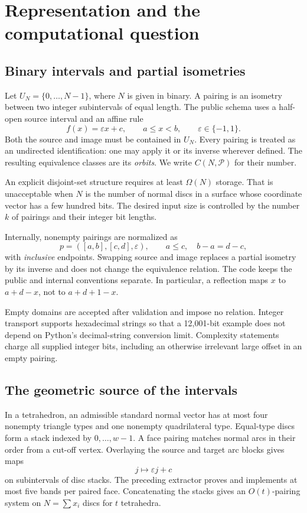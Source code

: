 \documentclass[11pt,a4paper]{article}
\theoremstyle{definition}\newtheorem{definition}[theorem]{Definition}
\theoremstyle{remark}\newtheorem{remark}[theorem]{Remark}
\begin{document}
\section{Representation and the computational question}

\subsection{Binary intervals and partial isometries}

Let $U_N=\{0,\ldots,N-1\}$, where $N$ is given in binary. A pairing is an
isometry between two integer subintervals of equal length. The public schema
uses a half-open source interval and an affine rule
\[
   f(x)=\varepsilon x+c,\qquad a\leq x<b,\qquad \varepsilon\in\{-1,1\}.
\]
Both the source and image must be contained in $U_N$. Every pairing is treated
as an undirected identification: one may apply it or its inverse wherever
defined. The resulting equivalence classes are its \emph{orbits}. We write
$C(N,\mathcal P)$ for their number.

An explicit disjoint-set structure requires at least $\Omega(N)$ storage.
That is unacceptable when $N$ is the number of normal discs in a surface
whose coordinate vector has a few hundred bits. The desired input size is
controlled by the number $k$ of pairings and their integer bit lengths.

Internally, nonempty pairings are normalized as
\[
 p=([a,b],[c,d],\varepsilon),\qquad a\leq c,
 \quad b-a=d-c,
\]
with \emph{inclusive} endpoints. Swapping source and image replaces a partial
isometry by its inverse and does not change the equivalence relation. The
code keeps the public and internal conventions separate. In particular, a
reflection maps $x$ to $a+d-x$, not to $a+d+1-x$.

Empty domains are accepted after validation and impose no relation. Integer
transport supports hexadecimal strings so that a 12,001-bit example does not
depend on Python's decimal-string conversion limit. Complexity statements
charge all supplied integer bits, including an otherwise irrelevant large
offset in an empty pairing.

\subsection{The geometric source of the intervals}

In a tetrahedron, an admissible standard normal vector has at most four
nonempty triangle types and one nonempty quadrilateral type. Equal-type discs
form a stack indexed by $0,\ldots,w-1$. A face pairing matches normal arcs
in their order from a cut-off vertex. Overlaying the source and target arc
blocks gives maps
\[
 j\longmapsto\varepsilon j+c
\]
on subintervals of disc stacks. The preceding extractor proves and implements
at most five bands per paired face. Concatenating the stacks gives an
$O(t)$-pairing system on $N=\sum x_i$ discs for $t$ tetrahedra.
\end{document}
